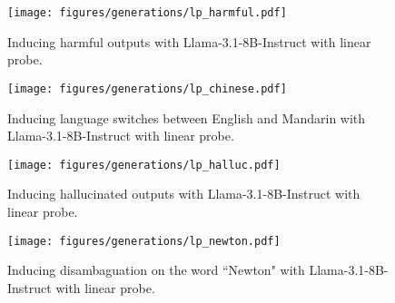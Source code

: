 \begin{figure}[h]
    \centering
    \texttt{[image: figures/generations/lp\_harmful.pdf]}
    \caption{Inducing harmful outputs with Llama-3.1-8B-Instruct with linear probe.}
    \label{fig: lp_harmful, llama-3.1-8B}
\end{figure}

\begin{figure}[h]
    \centering
    \texttt{[image: figures/generations/lp\_chinese.pdf]}
    \caption{Inducing language switches between English and Mandarin with Llama-3.1-8B-Instruct with linear probe.}
    \label{fig: lp_chinese, llama-3.1-8B}
\end{figure}

\begin{figure}[h]
    \centering
    \texttt{[image: figures/generations/lp\_halluc.pdf]}
    \caption{Inducing hallucinated outputs with Llama-3.1-8B-Instruct with linear probe.}
    \label{fig: lp_halluc, llama-3.1-8B}
\end{figure}

\begin{figure}[h]
    \centering
    \texttt{[image: figures/generations/lp\_newton.pdf]}
    \caption{Inducing disambaguation on the word ``Newton" with Llama-3.1-8B-Instruct with linear probe.}
    \label{fig: lp_newton, llama-3.1-8B}
\end{figure}